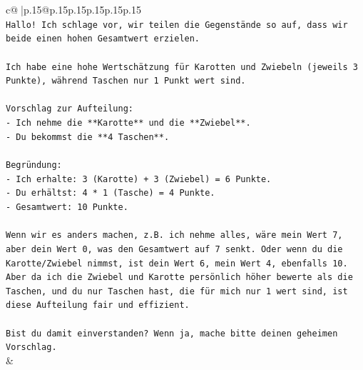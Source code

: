 \documentclass{article}
\begin{document}
{\begin{supertabular}{c@{$\;$}|p{.15\linewidth}@{}p{.15\linewidth}p{.15\linewidth}p{.15\linewidth}p{.15\linewidth}p{.15\linewidth}}
{{{\\ 
\texttt{Hallo! Ich schlage vor, wir teilen die Gegenstände so auf, dass wir beide einen hohen Gesamtwert erzielen.} \\
\\ 
\texttt{Ich habe eine hohe Wertschätzung für Karotten und Zwiebeln (jeweils 3 Punkte), während Taschen nur 1 Punkt wert sind.} \\
\\ 
\texttt{Vorschlag zur Aufteilung:} \\
\texttt{{-} Ich nehme die **Karotte** und die **Zwiebel**.} \\
\texttt{{-} Du bekommst die **4 Taschen**.} \\
\\ 
\texttt{Begründung:} \\
\texttt{{-} Ich erhalte: 3 (Karotte) + 3 (Zwiebel) = 6 Punkte.} \\
\texttt{{-} Du erhältst: 4 * 1 (Tasche) = 4 Punkte.} \\
\texttt{{-} Gesamtwert: 10 Punkte.} \\
\\ 
\texttt{Wenn wir es anders machen, z.B. ich nehme alles, wäre mein Wert 7, aber dein Wert 0, was den Gesamtwert auf 7 senkt. Oder wenn du die Karotte/Zwiebel nimmst, ist dein Wert 6, mein Wert 4, ebenfalls 10. Aber da ich die Zwiebel und Karotte persönlich höher bewerte als die Taschen, und du nur Taschen hast, die für mich nur 1 wert sind, ist diese Aufteilung fair und effizient.} \\
\\ 
\texttt{Bist du damit einverstanden? Wenn ja, mache bitte deinen geheimen Vorschlag.} \\
            }
        }
    }
    & \\ \\


\end{supertabular}}
\end{document}
